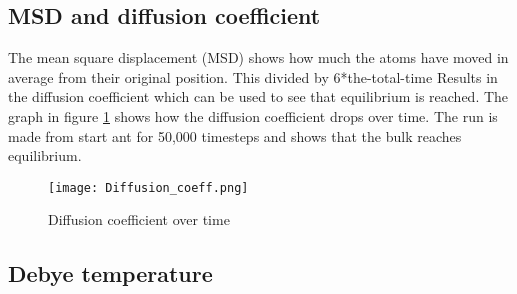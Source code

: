 \subsection{MSD and diffusion coefficient}
The mean square displacement (MSD) shows how much the atoms have moved in average from their original position. This divided by 6*the-total-time Results in the diffusion coefficient which can be used to see that equilibrium is reached. The graph in figure \ref{fig:Diffusion_coeff} shows how the diffusion coefficient drops over time. The run is made from start ant for 50,000 timesteps and shows that the bulk reaches equilibrium. 
\begin{figure}[ht]
	\centering
	\texttt{[image: Diffusion\_coeff.png]}
	\caption{Diffusion coefficient over time}
	\label{fig:Diffusion_coeff}
\end{figure}


\subsection{Debye temperature}


